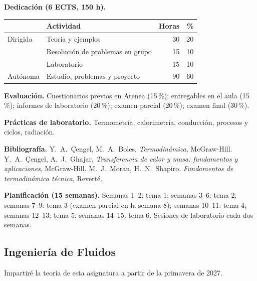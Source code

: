 \documentclass[11pt]{article}
\begin{document}
\textbf{Dedicación (6 ECTS, 150 h).}
\begin{center}\small
\begin{tabular}{@{}llrr@{}}
\toprule
& Actividad & Horas & \% \\ \midrule
Dirigida & Teoría y ejemplos & 30 & 20 \\
         & Resolución de problemas en grupo & 15 & 10 \\
         & Laboratorio & 15 & 10 \\
Autónoma & Estudio, problemas y proyecto & 90 & 60 \\ \bottomrule
\end{tabular}
\end{center}

\textbf{Evaluación.} Cuestionarios previos en Atenea (15\,\%); entregables en el aula
(15\,\%); informes de laboratorio (20\,\%); examen parcial (20\,\%); examen final (30\,\%).

\textbf{Prácticas de laboratorio.} Termometría, calorimetría, conducción, procesos y ciclos, radiación.

\textbf{Bibliografía.} Y.\ A.\ \c{C}engel, M.\ A.\ Boles, \emph{Termodinámica},
McGraw-Hill. Y.\ A.\ \c{C}engel, A.\ J.\ Ghajar, \emph{Transferencia de calor y masa:
fundamentos y aplicaciones}, McGraw-Hill. M.\ J.\ Moran, H.\ N.\ Shapiro, \emph{Fundamentos
de termodinámica técnica}, Reverté.

\textbf{Planificación (15 semanas).} Semanas 1--2: tema 1; semanas 3--6: tema 2; semanas
7--9: tema 3 (examen parcial en la semana 8); semanas 10--11: tema 4; semanas 12--13: tema
5; semanas 14--15: tema 6. Sesiones de laboratorio cada dos semanas.

\subsection{Ingeniería de Fluidos}\label{sec:ef}
Impartiré la teoría de esta asignatura a partir de la primavera de 2027.
\end{document}
